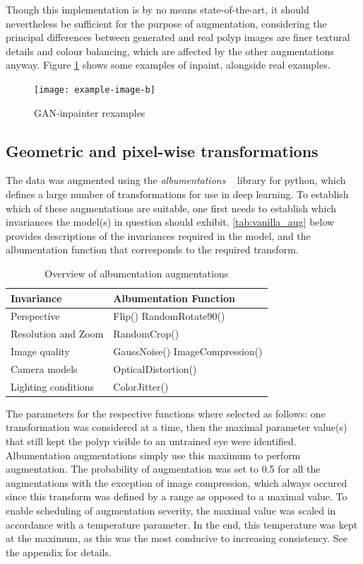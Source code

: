Though this implementation is by no means state-of-the-art, it should nevertheless be sufficient for the purpose of augmentation, considering the principal differences between generated and real polyp images are finer textural details and colour balancing, which are affected by the other augmentations anyway. Figure \ref{fig:inpaint} shows some examples of inpaint, alongside real examples.

\begin{figure}
    \centering
    \texttt{[image: example-image-b]} 
    \caption{GAN-inpainter rexamples}
    \label{fig:inpaint}
\end{figure}

\subsection{Geometric and pixel-wise transformations}
The data was augmented using the \textit{albumentations} ~\cite{albumentations} library for python, which defines a large number of transformations for use in deep learning. To establish which of these augmentations are suitable, one first needs to establish which invariances the model(s) in question should exhibit. \autoref{tab:vanilla_aug} below provides descriptions of the invariances required in the model, and the albumentation function that corresponds to the required transform. 
\begin{table}[ht]
    \centering
\begin{tabularx}{\textwidth}{|X|X|}
    \toprule
    \textbf{Invariance} & \textbf{Albumentation Function}\\
    \midrule
    Perspective &Flip() \newline RandomRotate90()\\
    Resolution and Zoom & RandomCrop() \\
    Image quality &GaussNoise() \newline ImageCompression()\\
    Camera models&OpticalDistortion() \\
    Lighting conditions & ColorJitter() \\
    \bottomrule
\end{tabularx}
    \caption{Overview of albumentation augmentations}
    \label{tab:vanilla_aug}
\end{table}


The parameters for the respective functions where selected as follows: one transformation was considered at a time, then the maximal parameter value(s) that still kept the polyp visible to an untrained eye were identified. Albumentation augmentations simply use this maximum to perform augmentation. The probability of augmentation was set to 0.5 for all the augmentations with the exception of image compression, which always occured since this transform was defined by a range as opposed to a maximal value. To enable scheduling of augmentation severity, the maximal value was scaled in accordance with a temperature parameter. In the end, this temperature was kept at the maximum, as this was the most conducive to increasing consistency. See the appendix for details. 

